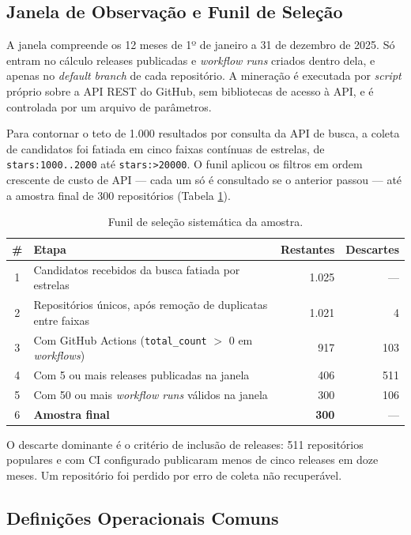 \subsection{Janela de Observação e Funil de Seleção}

A janela compreende os 12 meses de 1º de janeiro a 31 de dezembro de 2025. Só entram no
cálculo releases publicadas e \emph{workflow runs} criados dentro dela, e apenas no
\emph{default branch} de cada repositório. A mineração é executada por \emph{script}
próprio sobre a API REST do GitHub, sem bibliotecas de acesso à API, e é controlada por um
arquivo de parâmetros.

Para contornar o teto de 1.000 resultados por consulta da API de busca, a coleta de
candidatos foi fatiada em cinco faixas contínuas de estrelas, de \texttt{stars:1000..2000}
até \texttt{stars:>20000}. O funil aplicou os filtros em ordem crescente de custo de API ---
cada um só é consultado se o anterior passou --- até a amostra final de 300 repositórios
(Tabela \ref{tab:funil}).

\begin{table}[ht]
\centering
\caption{Funil de seleção sistemática da amostra.}
\label{tab:funil}
\footnotesize
\begin{tabular}{clrr}
\toprule
\textbf{\#} & \textbf{Etapa} & \textbf{Restantes} & \textbf{Descartes} \\
\midrule
1 & Candidatos recebidos da busca fatiada por estrelas & 1.025 & --- \\
2 & Repositórios únicos, após remoção de duplicatas entre faixas & 1.021 & 4 \\
3 & Com GitHub Actions (\texttt{total\_count} $>$ 0 em \emph{workflows}) & 917 & 103 \\
4 & Com 5 ou mais releases publicadas na janela & 406 & 511 \\
5 & Com 50 ou mais \emph{workflow runs} válidos na janela & 300 & 106 \\
\midrule
6 & \textbf{Amostra final} & \textbf{300} & --- \\
\bottomrule
\end{tabular}
\end{table}

O descarte dominante é o critério de inclusão de releases: 511 repositórios populares e com
CI configurado publicaram menos de cinco releases em doze meses. Um repositório foi perdido
por erro de coleta não recuperável.

\subsection{Definições Operacionais Comuns}

